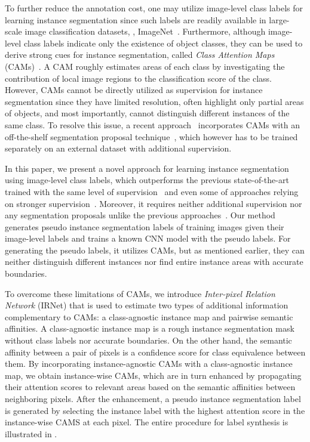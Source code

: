 To further reduce the annotation cost, one may utilize image-level class labels for learning instance segmentation since such labels are readily available in large-scale image classification datasets, \eg, ImageNet~\cite{Russakovsky2015}.
Furthermore, although image-level class labels indicate only the existence of object classes, they can be used to derive strong cues for instance segmentation, called \emph{Class Attention Maps} (CAMs)~\cite{Cam,Oquab15,Wei_2017_CVPR,Selvaraju_2017_ICCV}.
A CAM roughly estimates areas of each class by investigating the contribution of local image regions to the classification score of the class.
However, CAMs cannot be directly utilized as supervision for instance segmentation since they have limited resolution, often highlight only partial areas of objects, and most importantly, cannot distinguish different instances of the same class.
To resolve this issue, a recent approach~\cite{PRM} incorporates CAMs with an off-the-shelf segmentation proposal technique~\cite{MCG}, which however has to be trained separately on an external dataset with additional supervision.










In this paper, we present a novel approach for learning instance segmentation using image-level class labels, which outperforms the previous state-of-the-art trained with the same level of supervision~\cite{PRM} and even some of approaches relying on stronger supervision~\cite{SDI,Sds}.
Moreover, it requires neither additional supervision nor any segmentation proposals unlike the previous approaches~\cite{Sds,PRM}.
Our method generates pseudo instance segmentation labels of training images given their image-level labels and trains a known CNN model with the pseudo labels.
For generating the pseudo labels, it utilizes CAMs, but as mentioned earlier, they can neither distinguish different instances nor find entire instance areas with accurate boundaries.

To overcome these limitations of CAMs, we introduce \emph{Inter-pixel Relation Network} (IRNet) that is used to estimate two types of additional information complementary to CAMs: a class-agnostic instance map and pairwise semantic affinities.
A class-agnostic instance map is a rough instance segmentation mask without class labels nor accurate boundaries.
On the other hand, the semantic affinity between a pair of pixels is a confidence score for class equivalence between them.
By incorporating instance-agnostic CAMs with a class-agnostic instance map, we obtain instance-wise CAMs, which are in turn enhanced by propagating their attention scores to relevant areas based on the semantic affinities between neighboring pixels.
After the enhancement, a pseudo instance segmentation label is generated by selecting the instance label with the highest attention score in the instance-wise CAMS at each pixel.
The entire procedure for label synthesis is illustrated in .


